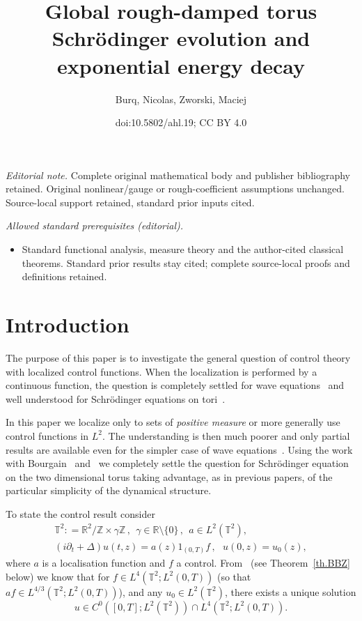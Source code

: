 \documentclass[10pt]{amsart}
\title{Global rough-damped torus Schrödinger evolution and exponential energy decay}
\author{Burq, Nicolas, Zworski, Maciej}
\date{doi:10.5802/ahl.19; CC BY 4.0}
\theoremstyle{definition}\newtheorem{defi}[theo]{Definition}\newtheorem{rema}[theo]{Remark}\newtheorem{exam}[theo]{Example}\newtheorem{exem}[theo]{Example}\newtheorem{nota}[theo]{Notation}
\newcommand{\R}{{\mathbb R}}
\newcommand{\TT}{{\mathbb T}}
\newcommand{\ZZ}{{\mathbb Z}}
\begin{document}
\maketitle
\noindent\textit{Editorial note.} Complete original mathematical body and publisher bibliography retained. Original nonlinear/gauge or rough-coefficient assumptions unchanged. Source-local support retained, standard prior inputs cited.\par\medskip
\noindent\textit{Allowed standard prerequisites (editorial).}\begin{itemize}
\item Standard functional analysis, measure theory and the author-cited classical theorems. Standard prior results stay cited; complete source-local proofs and definitions retained.
\end{itemize}\medskip

\section{Introduction}\label{in}

The purpose of this paper is to investigate the general question of control theory with localized control functions. When the localization is performed by a continuous function, the question is completely settled for wave equations~\cite{BLR,BG} and well understood for Schrödinger equations on tori~\cite{Ha, Ja, Ko, BZ4, AM}.

In this paper we localize only to sets of \emph{positive measure} or more generally use control functions in $ L^2 $. The understanding is then much poorer and only partial results are available even for the simpler case of wave equations~\cite{Bu16,Bu17}. Using the work with Bourgain~\cite{BBZ} and~\cite{BZ4} we completely settle the question for Schrödinger equation on the two dimensional torus taking advantage, as in previous papers, of the particular simplicity of the dynamical structure.


To state the control result consider
\begin{equation}\label{eq:con}
\begin{gathered} \TT^2 : = \R^2 / \ZZ \times \gamma \ZZ \,, \ \ \gamma \in \R \setminus \{
0 \}\,, \ \ a \in L^2 (\TT^2), \\
(i \partial_t + \Delta) u (t, z) = a(z) 1_{(0,T)}f \,, \ \ \ u (0, z) =u_0 (z),
\end{gathered}
\end{equation}
where $a $ is a localisation function and $f$ a control. From~\cite[Proposition~2.2]{BBZ} (see Theorem~\ref{th.BBZ} below) we know that for $f \in L^{4}(\TT^2 ; L^2(0,T))$ (so that $af \in L^{4/3}(\TT^2 ; L^2(0,T))$), and any $u_0 \in L^2(\TT^2)$, there exists a unique solution
\[
u \in C^0 ([0,T]; L^2(\TT^2)) \cap L^4 (\TT^2; L^2(0,T)).
\]
\end{document}
